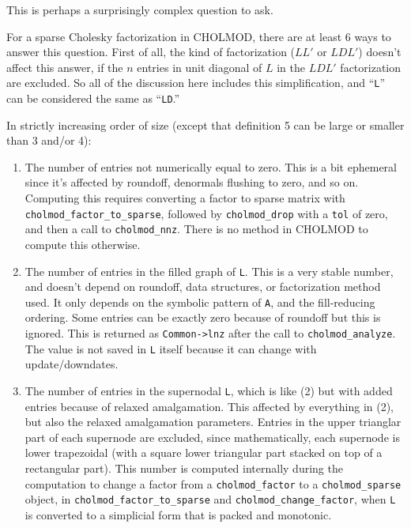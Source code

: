 \documentclass[11pt]{article}
\begin{document}
This is perhaps a surprisingly complex question to ask.

For a sparse Cholesky factorization in CHOLMOD, there are at least 6 ways to
answer this question.  First of all, the kind of factorization ($LL'$ or
$LDL'$) doesn't affect this answer, if the $n$ entries in unit diagonal of $L$
in the $LDL'$ factorization are excluded.  So all of the discussion here
includes this simplification, and ``\verb'L''' can be considered the same
as ``\verb'LD'.''

In strictly increasing order of size (except that definition 5 can be large or
smaller than 3 and/or 4):

\begin{enumerate}

\item
The number of entries not numerically equal to zero. This is a bit ephemeral
since it's affected by roundoff, denormals flushing to zero, and so on.
Computing this requires converting a factor to sparse matrix with
\verb'cholmod_factor_to_sparse', followed by \verb'cholmod_drop' with a
\verb'tol' of zero, and then a call to \verb'cholmod_nnz'.  There is no method
in CHOLMOD to compute this otherwise.

\item
The number of entries in the filled graph of \verb'L'. This is a very stable
number, and doesn't depend on roundoff, data structures, or factorization
method used.  It only depends on the symbolic pattern of \verb'A', and the
fill-reducing ordering.  Some entries can be exactly zero because of roundoff
but this is ignored.  This is returned as \verb'Common->lnz' after the call to
\verb'cholmod_analyze'.  The value is not saved in \verb'L' itself because it
can change with update/downdates.

\item
The number of entries in the supernodal \verb'L', which is like (2) but with
added entries because of relaxed amalgamation. This affected by everything in
(2), but also the relaxed amalgamation parameters.  Entries in the upper
trianglar part of each supernode are excluded, since mathematically, each
supernode is lower trapezoidal (with a square lower triangular part stacked on
top of a rectangular part).  This number is computed internally during
the computation to change a factor from a \verb'cholmod_factor' to a
\verb'cholmod_sparse' object, in \verb'cholmod_factor_to_sparse'
and \verb'cholmod_change_factor', when \verb'L' is converted to a
simplicial form that is packed and monotonic.


\end{enumerate}
\end{document}
